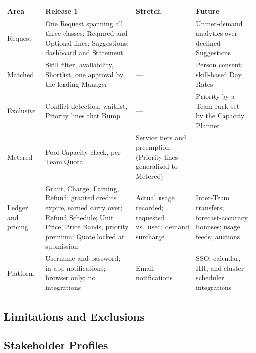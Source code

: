 {\footnotesize
\begin{tabularx}{\textwidth}{@{}L{1.8cm}YYY@{}}
\toprule
\textbf{Area} & \textbf{Release 1} & \textbf{Stretch} & \textbf{Future} \\
\midrule
Request & One Request spanning all three classes; Required and Optional lines; Suggestions; dashboard and Statement & --- & Unmet-demand analytics over declined Suggestions \\
Matched & Skill filter, availability, Shortlist, one approval by the lending Manager & --- & Person consent; skill-based Day Rates \\
Exclusive & Conflict detection, waitlist, Priority lines that Bump & --- & Priority by a Team rank set by the Capacity Planner \\
Metered & Pool Capacity check, per-Team Quota & Service tiers and preemption (Priority lines generalized to Metered) & --- \\
Ledger and pricing & Grant, Charge, Earning, Refund; granted credits expire, earned carry over; Refund Schedule; Unit Price, Price Bands, priority premium; Quote locked at submission & Actual usage recorded; requested vs.\ used; demand surcharge & Inter-Team transfers; forecast-accuracy bonuses; usage feeds; auctions \\
Platform & Username and password; in-app notifications; browser only; no integrations & Email notifications & SSO; calendar, HR, and cluster-scheduler integrations \\
\bottomrule
\end{tabularx}
}

\subsection{Limitations and Exclusions}


\subsection{Stakeholder Profiles}

